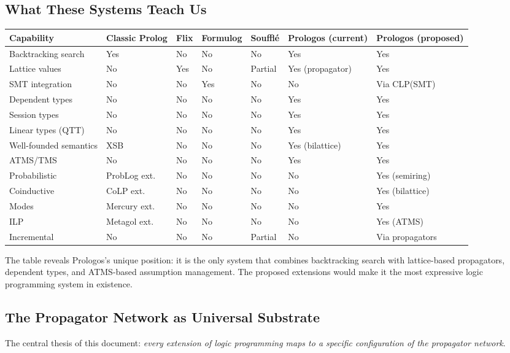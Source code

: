 \documentclass[11pt]{article}
\begin{document}
\subsection{What These Systems Teach Us}
\label{sec:org6df367c}

\begin{center}
\begin{tabular}{lllllll}
Capability & Classic Prolog & Flix & Formulog & Soufflé & Prologos (current) & Prologos (proposed)\\
\hline
Backtracking search & Yes & No & No & No & Yes & Yes\\
Lattice values & No & Yes & No & Partial & Yes (propagator) & Yes\\
SMT integration & No & No & Yes & No & No & Via CLP(SMT)\\
Dependent types & No & No & No & No & Yes & Yes\\
Session types & No & No & No & No & Yes & Yes\\
Linear types (QTT) & No & No & No & No & Yes & Yes\\
Well-founded semantics & XSB & No & No & No & Yes (bilattice) & Yes\\
ATMS/TMS & No & No & No & No & Yes & Yes\\
Probabilistic & ProbLog ext. & No & No & No & No & Yes (semiring)\\
Coinductive & CoLP ext. & No & No & No & No & Yes (bilattice)\\
Modes & Mercury ext. & No & No & No & No & Yes\\
ILP & Metagol ext. & No & No & No & No & Yes (ATMS)\\
Incremental & No & No & No & Partial & No & Via propagators\\
\end{tabular}
\end{center}

The table reveals Prologos's unique position: it is the only system that
combines backtracking search with lattice-based propagators, dependent types,
and ATMS-based assumption management. The proposed extensions would make it
the most expressive logic programming system in existence.
\subsection{The Propagator Network as Universal Substrate}
\label{sec:orgcdaf224}

The central thesis of this document: \emph{every extension of logic programming
maps to a specific configuration of the propagator network}.
\end{document}
